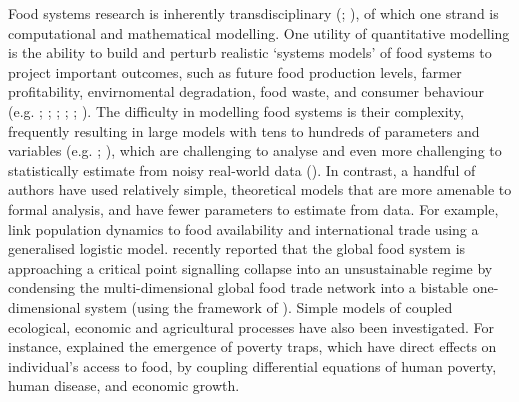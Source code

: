 \documentclass[12pt]{article}
\begin{document}
Food systems research is inherently transdisciplinary (\cite{drimie2013}; \cite{hammond2012}), of which one strand is computational and mathematical modelling. One utility of quantitative modelling is the ability to build and perturb realistic `systems models' of food systems to project important outcomes, such as future food production levels, farmer profitability, envirnomental degradation, food waste, and consumer behaviour (e.g. \cite{springmann2018}; \cite{marchand2016}; \cite{sampedro2020}; \cite{suweis2015}; \cite{scalco2019}; \cite{allen2016}). The difficulty in modelling food systems is their complexity, frequently resulting in large models with tens to hundreds of parameters and variables (e.g. \cite{sampedro2020}; \cite{springmann2018}), which are challenging to analyse and even more challenging to statistically estimate from noisy real-world data (\cite{sterman2000}). In contrast, a handful of authors have used relatively simple, theoretical models that are more amenable to formal analysis, and have fewer parameters to estimate from data. For example, \textcite{suweis2015} link population dynamics to food availability and international trade using a generalised logistic model. \textcite{tu2019} recently reported that the global food system is approaching a critical point signalling collapse into an unsustainable regime by condensing the multi-dimensional global food trade network into a bistable one-dimensional system (using the framework of \cite{gao2016}). Simple models of coupled ecological, economic and agricultural processes have also been investigated. For instance, \textcite{ngonghala2017} explained the emergence of poverty traps, which have direct effects on individual's access to food, by coupling differential equations of human poverty, human disease, and economic growth.
\end{document}
